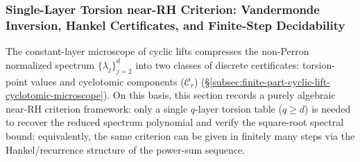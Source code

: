 \subsubsection{Single-Layer Torsion near-RH Criterion: Vandermonde Inversion, Hankel Certificates, and Finite-Step Decidability}\label{subsubsec:finite-part-single-layer-torsion-near-rh}
The constant-layer microscope of cyclic lifts compresses the non-Perron normalized spectrum \(\{\lambda_j\}_{j=2}^d\) into two classes of discrete certificates: torsion-point values and cyclotomic components (\(\mathcal{C}_r\)) (\S\ref{subsec:finite-part-cyclic-lift-cyclotomic-microscope}).
On this basis, this section records a purely algebraic near-RH criterion framework: only a single \(q\)-layer torsion table (\(q\ge d\)) is needed to recover the reduced spectrum polynomial and verify the square-root spectral bound; equivalently, the same criterion can be given in finitely many steps via the Hankel/recurrence structure of the power-sum sequence.

